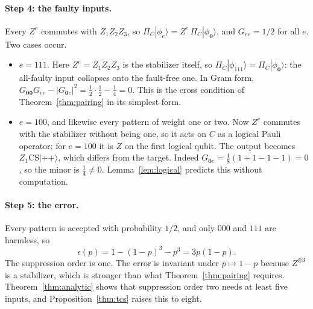 \documentclass[aps,prl,reprint,twocolumn,amsmath,amssymb,floatfix,nofootinbib,superscriptaddress]{revtex4-2}
\newcommand{\CS}{\mathrm{CS}}
\begin{document}
\paragraph*{Step 4: the faulty inputs.}
Every $Z^e$ commutes with $Z_1Z_2Z_3$, so $\Pi_C|\phi_e\rangle=Z^e\,\Pi_C|\phi_{\mathbf0}\rangle$, and $G_{ee}=1/2$ for all $e$. Two cases occur.
\begin{itemize}
\item $e=111$. Here $Z^e=Z_1Z_2Z_3$ is the stabilizer itself, so $\Pi_C|\phi_{111}\rangle=\Pi_C|\phi_{\mathbf0}\rangle$: the all-faulty input collapses onto the fault-free one. In Gram form, $G_{\mathbf0\mathbf0}G_{ee}-|G_{\mathbf0e}|^2=\tfrac12\cdot\tfrac12-\tfrac14=0$. This is the cross condition of Theorem~\ref{thm:pairing} in its simplest form.
\item $e=100$, and likewise every pattern of weight one or two. Now $Z^e$ commutes with the stabilizer without being one, so it acts on $C$ as a logical Pauli operator; for $e=100$ it is $Z$ on the first logical qubit. The output becomes $Z_1\CS|{+}{+}\rangle$, which differs from the target. Indeed $G_{\mathbf0e}=\tfrac18(1+1-1-1)=0$, so the minor is $\tfrac14\neq0$. Lemma~\ref{lem:logical} predicts this without computation.
\end{itemize}

\paragraph*{Step 5: the error.}
Every pattern is accepted with probability $1/2$, and only $000$ and $111$ are harmless, so
\begin{equation}
 \epsilon(p)=1-(1-p)^3-p^3=3p(1-p).
\end{equation}
The suppression order is one. The error is invariant under $p\mapsto1-p$ because $Z^{\otimes3}$ is a stabilizer, which is stronger than what Theorem~\ref{thm:pairing} requires. Theorem~\ref{thm:analytic} shows that suppression order two needs at least five inputs, and Proposition~\ref{thm:tcs} raises this to eight.
\end{document}
